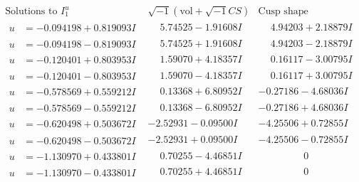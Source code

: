 \documentclass[1p]{elsarticle_modified}
\theoremstyle{definition}
\newcommand{\I}{\sqrt{-1}}
\begin{document}
$$\begin{array}{c|c|c}
\text{Solutions to }I^u_{1}& \I (\text{vol} + \sqrt{-1}CS) & \text{Cusp shape}\\
 \hline 
\begin{aligned}
u &= -0.094198 + 0.819093 I\end{aligned}
 & \phantom{-}5.74525 - 1.91608 I & \phantom{-}4.94203 + 2.18879 I \\ \hline\begin{aligned}
u &= -0.094198 - 0.819093 I\end{aligned}
 & \phantom{-}5.74525 + 1.91608 I & \phantom{-}4.94203 - 2.18879 I \\ \hline\begin{aligned}
u &= -0.120401 + 0.803953 I\end{aligned}
 & \phantom{-}1.59070 + 4.18357 I & \phantom{-}0.16117 - 3.00795 I \\ \hline\begin{aligned}
u &= -0.120401 - 0.803953 I\end{aligned}
 & \phantom{-}1.59070 - 4.18357 I & \phantom{-}0.16117 + 3.00795 I \\ \hline\begin{aligned}
u &= -0.578569 + 0.559212 I\end{aligned}
 & \phantom{-}0.13368 + 6.80952 I & -0.27186 - 4.68036 I \\ \hline\begin{aligned}
u &= -0.578569 - 0.559212 I\end{aligned}
 & \phantom{-}0.13368 - 6.80952 I & -0.27186 + 4.68036 I \\ \hline\begin{aligned}
u &= -0.620498 + 0.503672 I\end{aligned}
 & -2.52931 - 0.09500 I & -4.25506 + 0.72855 I \\ \hline\begin{aligned}
u &= -0.620498 - 0.503672 I\end{aligned}
 & -2.52931 + 0.09500 I & -4.25506 - 0.72855 I \\ \hline\begin{aligned}
u &= -1.130970 + 0.433801 I\end{aligned}
 & \phantom{-}0.70255 - 4.46851 I & \phantom{-0.000000 } 0 \\ \hline\begin{aligned}
u &= -1.130970 - 0.433801 I\end{aligned}
 & \phantom{-}0.70255 + 4.46851 I & \phantom{-0.000000 } 0 \\ \hline\begin{aligned}

\end{aligned}
\end{array}$$
\end{document}
